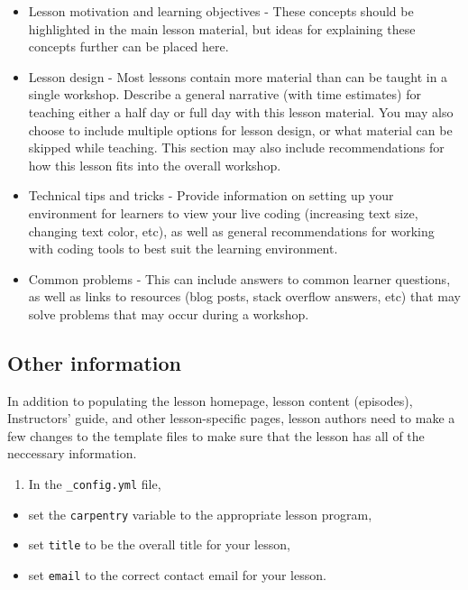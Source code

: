 \documentclass[
]{book}
\providecommand{\tightlist}{%
  \setlength{\itemsep}{0pt}\setlength{\parskip}{0pt}}
\begin{document}
\begin{itemize}
\item
  Lesson motivation and learning objectives - These concepts should be highlighted in the main lesson material,
  but ideas for
  explaining these concepts further can be placed here.
\item
  Lesson design - Most lessons contain more material than can be taught in a single workshop.
  Describe a general narrative (with time estimates) for teaching either a half day
  or full day with this lesson material. You may also choose to include multiple
  options for lesson design, or what material can be skipped while teaching.
  This section may also include recommendations for how this lesson fits into
  the overall workshop.
\item
  Technical tips and tricks - Provide information on setting up your environment for learners to view your
  live coding (increasing text size, changing text color, etc), as well as
  general recommendations for working with coding tools to best suit the
  learning environment.
\item
  Common problems - This can include answers to common learner questions, as well as links to
  resources (blog posts, stack overflow answers, etc) that may solve problems that
  may occur during a workshop.
\end{itemize}

\hypertarget{other-information}{%
\subsection{Other information}\label{other-information}}

In addition to populating the lesson homepage, lesson content (episodes),
Instructors' guide, and other lesson-specific
pages, lesson authors need to make a few changes to the template
files to make sure that the lesson has all of the neccessary
information.

\begin{enumerate}
\def\labelenumi{\arabic{enumi}.}
\tightlist
\item
  In the \texttt{\_config.yml} file,
\end{enumerate}

\begin{itemize}
\tightlist
\item
  set the \texttt{carpentry} variable to the appropriate lesson program,
\item
  set \texttt{title} to be the overall title for your lesson,
\item
  set \texttt{email} to the correct contact email for your lesson.
\end{itemize}
\end{document}
